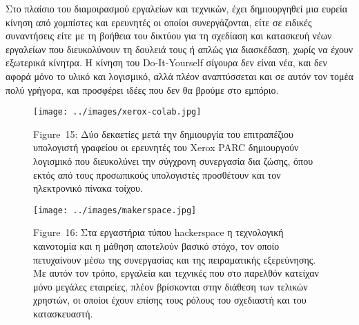 \documentclass[
]{article}
\begin{document}
Στο πλαίσιο του διαμοιρασμού εργαλείων και τεχνικών, έχει δημιουργηθεί
μια ευρεία κίνηση από χομπίστες και ερευνητές οι οποίοι συνεργάζονται,
είτε σε ειδικές συναντήσεις είτε με τη βοήθεια του δικτύου για τη
σχεδίαση και κατασκευή νέων εργαλείων που διευκολύνουν τη δουλειά τους ή
απλώς για διασκέδαση, χωρίς να έχουν εξωτερικά κίνητρα. Η κίνηση του
Do-It-Yourself σίγουρα δεν είναι νέα, και δεν αφορά μόνο το υλικό και
λογισμικό, αλλά πλέον αναπτύσσεται και σε αυτόν τον τομέα πολύ γρήγορα,
και προσφέρει ιδέες που δεν θα βρούμε στο εμπόριο.

\leavevmode{}%
\begin{figure}
\hypertarget{fig:xerox-colab}{%
\centering
\texttt{[image: ../images/xerox-colab.jpg]}
\caption{Figure~15: Δύο δεκαετίες μετά την δημιουργία του επιτραπέζιου
υπολογιστή γραφείου οι ερευνητές του Xerox PARC δημιουργούν λογισμικό
που διευκολύνει την σύγχρονη συνεργασία δια ζώσης, όπου εκτός από τους
προσωπικούς υπολογιστές προσθέτουν και τον ηλεκτρονικό πίνακα
τοίχου.}\label{fig:xerox-colab}
}
\end{figure}

\leavevmode{}%
\begin{figure}
\hypertarget{fig:makerspace}{%
\centering
\texttt{[image: ../images/makerspace.jpg]}
\caption{Figure~16: Στα εργαστήρια τύπου hackerspace η τεχνολογική
καινοτομία και η μάθηση αποτελούν βασικό στόχο, τον οποίο πετυχαίνουν
μέσω της συνεργασίας και της πειραματικής εξερεύνησης. Με αυτόν τον
τρόπο, εργαλεία και τεχνικές που στο παρελθόν κατείχαν μόνο μεγάλες
εταιρείες, πλέον βρίσκονται στην διάθεση των τελικών χρηστών, οι οποίοι
έχουν επίσης τους ρόλους του σχεδιαστή και του
κατασκευαστή.}\label{fig:makerspace}
}
\end{figure}
\end{document}
